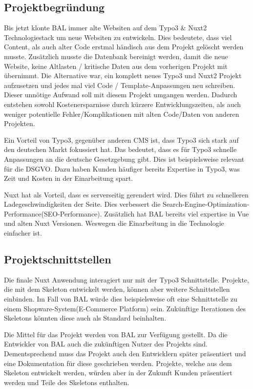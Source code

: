 \subsection{Projektbegründung} 
\label{sec:Projektbegruendung}
Bis jetzt klonte \acs{BAL} immer alte Websiten auf dem Typo3 \& Nuxt2 Technologiestack um neue Websiten zu entwickeln. Dies bedeutete, dass viel Content, als auch alter Code erstmal händisch aus dem Projekt gelöscht werden musste. Zusätzlich musste die Datenbank bereinigt werden, damit die neue Website, keine Altlasten / kritische Daten aus dem vorherigen Projekt mit übernimmt. Die Alternative war, ein komplett neues Typo3 und Nuxt2 Projekt aufzusetzen und jedes mal viel Code / Template-Anpassungen neu schreiben. Dieser unnötige Aufwand soll mit diesem Projekt umgangen werden. Dadurch entstehen sowohl Kostenersparnisse durch kürzere Entwicklungszeiten, als auch weniger potentielle Fehler/Komplikationen mit alten Code/Daten von anderen Projekten.

Ein Vorteil von Typo3, gegenüber anderen \acs{CMS} ist, dass Typo3 sich stark auf den deutschen Markt fokussiert hat. Das bedeutet, dass es für Typo3 schnelle Anpassungen an die deutsche Gesetzgebung gibt. Dies ist beispielsweise relevant für die \acs{DSGVO}. Dazu haben Kunden häufiger bereits Expertise in Typo3, was Zeit und Kosten in der Einarbeitung spart.

Nuxt hat als Vorteil, dass es serverseitig gerendert wird. Dies führt zu schnelleren Ladegeschwindigkeiten der Seite. Dies verbessert die Search-Engine-Optimization-Performance(\acs{SEO}-Performance). Zusätzlich hat \acs{BAL} bereits viel expertise in Vue und alten Nuxt Versionen. Weswegen die Einarbeitung in die Technologie einfacher ist.

\subsection{Projektschnittstellen} 
\label{sec:Projektschnittstellen}

Die finale Nuxt Anwendung interagiert nur mit der Typo3 Schnittstelle. Projekte, die mit dem Skeleton entwickelt werden, können aber weitere Schnittstellen einbinden. Im Fall von \acs{BAL} würde dies beispielsweise oft eine Schnittstelle zu einem Shopware-System(E-Commerce Platform) sein. Zukünftige Iterationen des Skeletons könnten diese auch als Standard beinhalten.

Die Mittel für das Projekt werden von  \acs{BAL} zur Verfügung gestellt. Da die Entwickler von \acs{BAL} auch die zukünftigen Nutzer des Projekts sind. Dementsprechend muss das Projekt auch den Entwicklern später präsentiert und eine Dokumentation für diese geschrieben werden. Projekte, welche aus dem Skeleton entwickelt werden, würden aber in der Zukunft Kunden präsentiert werden und Teile des Skeletons enthalten.


